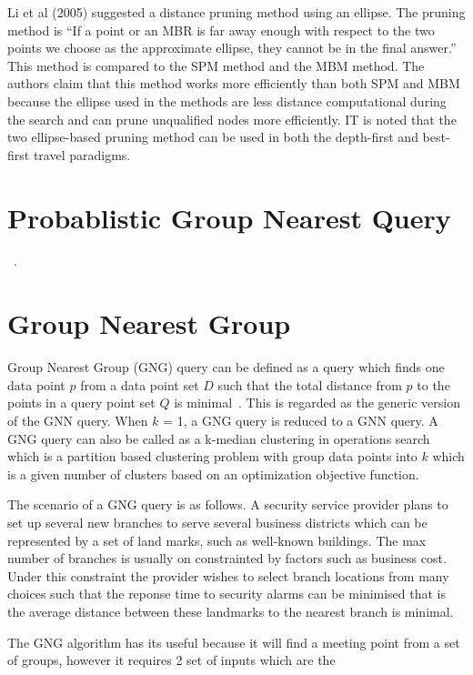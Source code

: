\documentclass[a4paper,11pt]{article}
\begin{document}
Li et al (2005) suggested a distance pruning method using an ellipse. The pruning method is ``If a point or an MBR is far away enough with respect to the two points we choose as the approximate ellipse, they cannot be in the final answer.'' This method is compared to the SPM method and the MBM method. The authors claim that this method works more efficiently than both SPM and MBM because the ellipse used in the methods are less distance computational during the search and can prune unqualified nodes more efficiently. IT is noted that the two ellipse-based pruning method can be used in both the depth-first and best-first travel paradigms.

\section{Probablistic Group Nearest Query}

~\cite{lian2008probabilistic}.

\section{Group Nearest Group}

Group Nearest Group (GNG) query can be defined as a query which finds one data point $p$ from a data point set $D$ such that the total distance from $p$ to the points in a query point set $Q$ is minimal~\cite{deng2012group}. This is regarded as the generic version of the GNN query. When $k$ = 1, a GNG query is reduced to a GNN query. A GNG query can also be called as a k-median clustering in operations search which is a partition based clustering problem with group data points into $k$ which is a given number of clusters based on an optimization objective function.

The scenario of a GNG query is as follows. A security service provider plans to set up several new branches to serve several business districts which can be represented by a set of land marks, such as well-known buildings. The max number of branches is usually on constrainted by factors such as business cost. Under this constraint the provider wishes to select branch locations from many choices such that the reponse time to security alarms can be minimised that is the average distance between these landmarks to the nearest branch is minimal.

The GNG algorithm has its useful because it will find a meeting point from a set of groups, however it requires 2 set of inputs which are the
\end{document}
